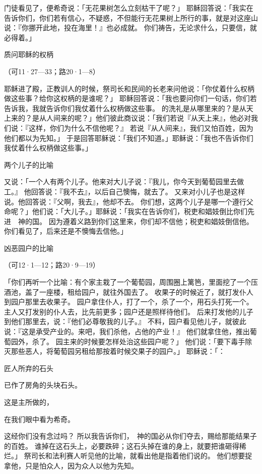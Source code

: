 {门徒看见了，便希奇说：「无花果树怎么立刻枯干了呢？」
耶稣回答说：「我实在告诉你们，你们若有信心，不疑惑，不但能行无花果树上所行的事，就是对这座山说：『你挪开此地，投在海里！』也必成就。
你们祷告，无论求什么，只要信，就必得着。」
\par }{\SH 质问耶稣的权柄
\par }{\R （可11·27—33；路20·1—8）
\par }{\PP {}耶稣进了殿，正教训人的时候，祭司长和民间的长老来问他说：「你仗着什么权柄做这些事？给你这权柄的是谁呢？」
耶稣回答说：「我也要问你们一句话，你们若告诉我，我就告诉你们我仗着什么权柄做这些事。
的洗礼是从哪里来的？是从天上来的？是从人间来的呢？」他们彼此商议说：「我们若说『从天上来』，他必对我们说：『这样，你们为什么不信他呢？』
若说『从人间来』，我们又怕百姓，因为他们都以{}为先知。」
于是回答耶稣说：「我们不知道。」耶稣说：「我也不告诉你们我仗着什么权柄做这些事。」
\par }{\SH 两个儿子的比喻
\par }{\PP {}又说：「一个人有两个儿子。他来对大儿子说：『我儿，你今天到葡萄园里去做工。』
他回答说：『我不去』，以后自己懊悔，就去了。
又来对小儿子也是这样说。他回答说：『父啊，我去』，他却不去。
你们想，这两个儿子是哪一个遵行父命呢？」他们说：「大儿子。」耶稣说：「我实在告诉你们，税吏和娼妓倒比你们先进　神的国。
因为{}遵着义路到你们这里来，你们却不信他；税吏和娼妓倒信他。你们看见了，后来还是不懊悔去信他。」
\par }{\SH 凶恶园户的比喻
\par }{\R （可12·1—12；路20·9—19）
\par }{\PP {}「你们再听一个比喻：有个家主栽了一个葡萄园，周围圈上篱笆，里面挖了一个压酒池，盖了一座楼，租给园户，就往外国去了。
收果子的时候近了，就打发仆人到园户那里去收果子。
园户拿住仆人，打了一个，杀了一个，用石头打死一个。
主人又打发别的仆人去，比先前更多；园户还是照样待他们。
后来打发他的儿子到他们那里去，{}说：『他们必尊敬我的儿子。』
不料，园户看见他儿子，就彼此说：『这是承受产业的。来吧，我们杀他，占他的产业！』
他们就拿住他，推出葡萄园外，杀了。
园主来的时候要怎样处治这些园户呢？」
他们说：「要下毒手除灭那些恶人，将葡萄园另租给那按着时候交果子的园户。」
耶稣说：「{}：
\par }{\Q 匠人所弃的石头
\par }{\Q 已作了房角的头块石头。
\par }{\Q 这是主所做的，
\par }{\Q 在我们眼中看为希奇。
\par }{\MM 这经你们没有念过吗？
所以我告诉你们，　神的国必从你们夺去，赐给那能结果子的百姓。
谁掉在这石头上，必要跌碎；这石头掉在谁的身上，就要把谁砸得稀烂。」
祭司长和法利赛人听见他的比喻，就看出他是指着他们说的。
他们想要捉拿他，只是怕众人，因为众人以他为先知。

}
